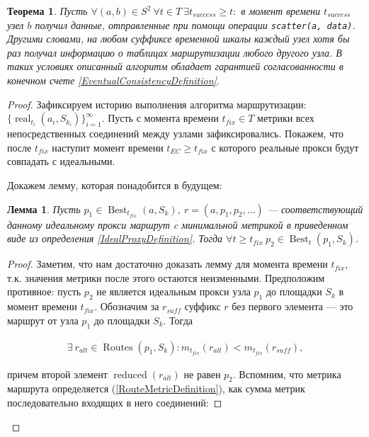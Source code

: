 \documentclass{article}
\theoremstyle{plain}
\newtheorem{theorem}{Теорема}[section]
\theoremstyle{plain}
\theoremstyle{plain}
\newtheorem{lemma}{Лемма}[section]
\theoremstyle{plain}
\theoremstyle{definition}
\theoremstyle{remark}
\theoremstyle{plain}
\DeclareMathOperator*{\real}{real}
\DeclareMathOperator*{\best}{Best}
\DeclareMathOperator*{\routes}{Routes}
\DeclareMathOperator*{\reduced}{reduced}
\begin{document}
\begin{theorem}
\label{RoutingEventualConsistencyTheorem}
    Пусть $\forall (a, b) \in S^2\ \forall t \in T\ \exists t_{success} \geq t :$ в момент времени $t_{success}$ узел $b$ получил данные, отправленные при помощи операции \texttt{scatter(a, data)}. Другими словами, на любом суффиксе временной шкалы каждый узел хотя бы раз получал информацию о таблицах маршрутизации любого другого узла. В таких условиях описанный алгоритм обладает гарантией согласованности в конечном счете \ref{EventualConsistencyDefinition}.
\end{theorem}
\begin{proof}
    Зафиксируем историю выполнения алгоритма маршрутизации: \\
    $\{\real_{t_i}(a_i, S_{k_i})\}_{i = 1}^{\infty}$. Пусть с момента времени $t_{fix} \in T$ метрики всех непосредственных соединений между узлами зафиксировались. Покажем, что после $t_{fix}$ наступит момент времени $t_{EC} \geq t_{fix}$ с которого реальные прокси будут совпадать с идеальными.
    
    Докажем лемму, которая понадобится в будущем:
    
    \begin{lemma}
    \label{IdealChain}
        Пусть $p_1 \in \best_{t_{fix}}(a, S_k)$, $r = (a, p_1, p_2, \ldots )$ --- соответствующий данному идеальному прокси маршрут c минимальной метрикой в приведенном виде из определения \ref{IdealProxyDefinition}. Тогда $\forall t \geq t_{fix}\ p_2 \in \best_t(p_1, S_k)$.
    \end{lemma}
    \begin{proof}
        Заметим, что нам достаточно доказать лемму для момента времени $t_{fix}$, т.к. значения метрики после этого остаются неизменными. Предположим противное: пусть $p_2$ не является идеальным прокси узла $p_1$ до площадки $S_k$ в момент времени $t_{fix}$. Обозначим за $r_{suff}$ суффикс $r$ без первого элемента --- это маршрут от узла $p_1$ до площадки $S_k$. Тогда
        
        \begin{equation*}
        \begin{aligned}
            \exists\ r_{alt} \in \routes(p_1, S_k) : m_{t_{fix}}(r_{alt}) < m_{t_{fix}}(r_{suff}),
        \end{aligned}
        \end{equation*}
        
        причем второй элемент $\reduced(r_{alt})$ не равен $p_2$. Вспомним, что метрика маршрута определяется (\ref{RouteMetricDefinition}), как сумма метрик последовательно входящих в него соединений:
        

\end{proof}
\end{proof}
\end{document}
